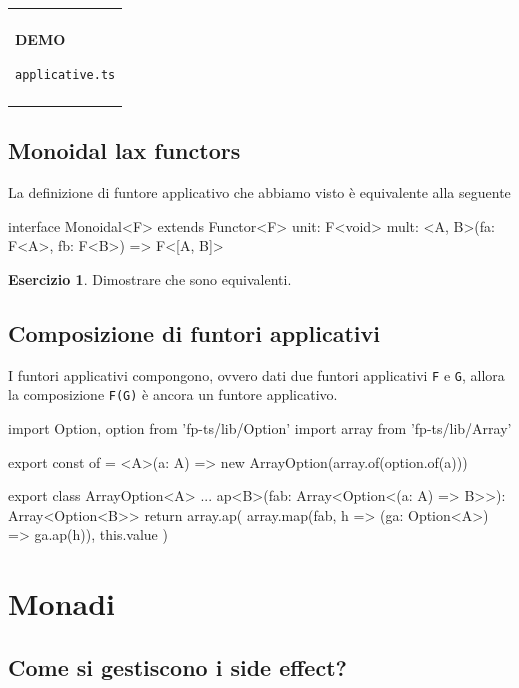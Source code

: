 \documentclass[12pt]{article}
\theoremstyle{definition}
\newtheorem{exercise}{Esercizio}[section]
\newenvironment{demo}
    {\begin{center}
    \begin{tabular}{|p{0.9\textwidth}|}
    \hline\\
    }
    {
    \\\\\hline
    \end{tabular}
    \end{center}
    }
\newenvironment{code}
  {\vspace{0.5cm} \VerbatimEnvironment\begin{typescriptcode}}
  {\end{typescriptcode} \vspace{0.2cm}}
\begin{document}
\begin{demo}
\begin{center}
\textbf{DEMO}

\texttt{applicative.ts}
\end{center}
\end{demo}

\subsection{Monoidal lax functors}

La definizione di funtore applicativo che abbiamo visto è equivalente alla seguente

\begin{code}
interface Monoidal<F> extends Functor<F> {
  unit: F<void>
  mult: <A, B>(fa: F<A>, fb: F<B>) => F<[A, B]>
}
\end{code}

\begin{exercise}
Dimostrare che sono equivalenti.
\end{exercise}

\subsection{Composizione di funtori applicativi}

I funtori applicativi compongono, ovvero dati due funtori applicativi \texttt{F} e \texttt{G},
allora la composizione \texttt{F(G)} è ancora un funtore applicativo.

\begin{code}
import { Option, option } from 'fp-ts/lib/Option'
import { array } from 'fp-ts/lib/Array'

export const of = <A>(a: A) =>
  new ArrayOption(array.of(option.of(a)))

export class ArrayOption<A> {
  ...
  ap<B>(fab: Array<Option<(a: A) => B>>): Array<Option<B>> {
    return array.ap(
      array.map(fab, h => (ga: Option<A>) => ga.ap(h)),
      this.value
    )
  }
}
\end{code}

\newpage

\section{Monadi}

\subsection{Come si gestiscono i side effect?}
\end{document}
